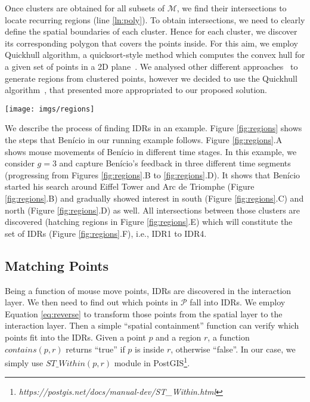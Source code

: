 \documentclass{vldb}
\begin{document}
\vspace{2pt}
Once clusters are obtained for all subsets of $\mathcal{M}$, we find their intersections to locate recurring regions (line \ref{ln:poly}). To obtain intersections, we need to clearly define the spatial boundaries of each cluster. Hence for each cluster, we discover its corresponding polygon that covers the points inside. For this aim, we employ Quickhull algorithm, a quicksort-style method which computes the convex hull for a given set of points in a 2D plane~\cite{Barber:1996}. We analysed other different approaches~\cite{Bevis1989,DUCKHAM2008,FADILI2004,ARAMPATZIS2006,Galton2006} to generate regions from clustered points, however we decided to use the Quickhull  algorithm~\cite{Barber:1996}, that presented more appropriated to our proposed solution.

\begin{figure*}[t]
\centering
   \texttt{[image: imgs/regions]}
  \caption{The process of finding IDRs on Airbnb dataset.}
  \label{fig:regions}
\end{figure*}

\vspace{2pt}
We describe the process of finding IDRs in an example. Figure \ref{fig:regions} shows the steps that Ben\'icio in our running example follows. Figure \ref{fig:regions}.A shows mouse movements of Ben\'icio in different time stages. In this example, we consider $g = 3$ and capture Ben\'icio's feedback in three different time segments (progressing from Figures \ref{fig:regions}.B to \ref{fig:regions}.D). It shows that Ben\'icio started his search around Eiffel Tower and Arc de Triomphe (Figure \ref{fig:regions}.B) and gradually showed interest in south (Figure \ref{fig:regions}.C) and north (Figure \ref{fig:regions}.D) as well. All intersections between those clusters are discovered (hatching regions in Figure \ref{fig:regions}.E) which will constitute the set of IDRs (Figure \ref{fig:regions}.F), i.e., IDR1 to IDR4.

\subsection{Matching Points}
Being a function of mouse move points, IDRs are discovered in the interaction layer. We then need to find out which points in $\mathcal{P}$ fall into IDRs. We employ Equation \ref{eq:reverse} to transform those points from the spatial layer to the interaction layer. Then a simple ``spatial containment'' function can verify which points fit into the IDRs. Given a point $p$ and a region $r$, a function $\mathit{contains}(p,r)$ returns ``true'' if $p$ is inside $r$, otherwise ``false''. In our case, we simply use $\mathit{ST\_Within}(p,r)$ module in PostGIS\footnote{\it https://postgis.net/docs/manual-dev/ST_Within.html}.
\end{document}
